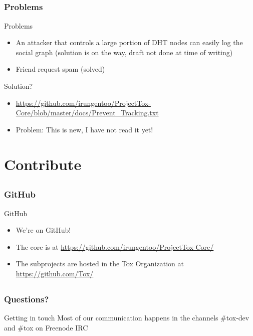 \documentclass{mybeamer}
\begin{document}
    \subsection{}
    \begin{frame}
        \frametitle{Problems}
        \begin{block}{Problems}
            \begin{itemize}
                \item An attacker that controls a large portion of DHT nodes can easily log the social graph (solution is on the way, draft not done at time of writing)
                \item Friend request spam (solved)
            \end{itemize}
        \end{block}
        \begin{block}{Solution?}
        	\begin{itemize}
        	\item \url{https://github.com/irungentoo/ProjectTox-Core/blob/master/docs/Prevent_Tracking.txt}
            \item Problem: This is new, I have not read it yet!
        	\end{itemize}
        \end{block}
    \end{frame}
    
    \section{Contribute}
        \subsection{}
        \begin{frame}
            \frametitle{GitHub}
            \begin{block}{GitHub}
                \begin{itemize}
                    \item We're on GitHub!
                    \item The core is at \url{https://github.com/irungentoo/ProjectTox-Core/}
                    \item The subprojects are hosted in the Tox Organization at \url{https://github.com/Tox/}
                \end{itemize}
            \end{block}
        \end{frame}
        
        \subsection{}
        \begin{frame}
            \frametitle{Questions?}
            \begin{block}{Getting in touch}
            Most of our communication happens in the channels \#tox-dev and \#tox on Freenode IRC
            \end{block}
        \end{frame}
        
\end{document}
